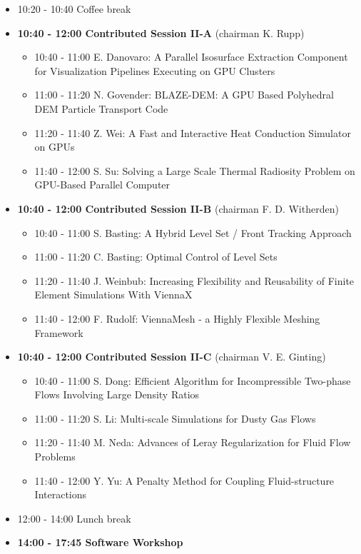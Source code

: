 \documentclass[10pt]{article}%
\begin{document}
\begin{itemize}
\begin{itemize}
  \end{itemize}
  \item 10:20 - 10:40 Coffee break
  \item {\bf 10:40 - 12:00 Contributed Session II-A} (chairman K. Rupp) 
  \begin{itemize}
    \item 10:40 - 11:00 {E. Danovaro}: {A Parallel Isosurface Extraction Component for Visualization Pipelines Executing on GPU Clusters}
    \item 11:00 - 11:20 {N. Govender}: {BLAZE-DEM: A GPU Based Polyhedral DEM Particle Transport Code}
    \item 11:20 - 11:40 {Z. Wei}: {A Fast and Interactive Heat Conduction Simulator on GPUs}
    \item 11:40 - 12:00 {S. Su}: {Solving a Large Scale Thermal Radiosity Problem on GPU-Based Parallel Computer}
  \end{itemize}
  \item {\bf 10:40 - 12:00 Contributed Session II-B} (chairman F. D. Witherden) 
  \begin{itemize}
    \item 10:40 - 11:00 {S. Basting}: {A Hybrid Level Set / Front Tracking Approach}
    \item 11:00 - 11:20 {C. Basting}: {Optimal Control of Level Sets}
    \item 11:20 - 11:40 {J. Weinbub}: {Increasing Flexibility and Reusability of Finite Element Simulations With ViennaX}
    \item 11:40 - 12:00 {F. Rudolf}: {ViennaMesh - a Highly Flexible Meshing Framework}
  \end{itemize}
  \item {\bf 10:40 - 12:00 Contributed Session II-C} (chairman V. E. Ginting) 
  \begin{itemize}
    \item 10:40 - 11:00 {S. Dong}: {Efficient Algorithm for Incompressible Two-phase Flows Involving Large Density Ratios}
    \item 11:00 - 11:20 {S. Li}: {Multi-scale Simulations for Dusty Gas Flows}
    \item 11:20 - 11:40 {M. Neda}: {Advances of Leray Regularization for Fluid Flow Problems}
    \item 11:40 - 12:00 {Y. Yu}: {A Penalty Method for Coupling Fluid-structure Interactions}
  \end{itemize}
  \item 12:00 - 14:00 Lunch break
  \newpage
  \item {\bf 14:00 - 17:45 Software Workshop}

\end{itemize}
\end{document}

